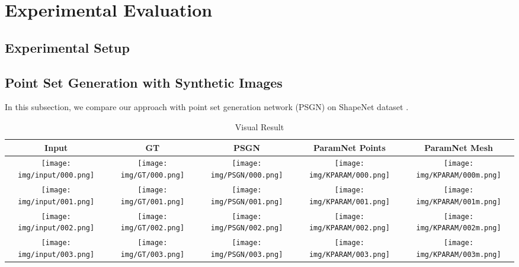 \section{Experimental Evaluation}
\subsection{Experimental Setup}
\subsection{Point Set Generation with Synthetic Images}
In this subsection, we compare our approach with point set generation network (PSGN)\cite{PSGN} on ShapeNet dataset \cite{shapenetdata}. 
\begin{table*}
	\centering
	\begin{tabular}{c c c c c}
		Input & GT & PSGN\cite{PSGN} & ParamNet Points & ParamNet Mesh \\
		\hline
		\texttt{[image: img/input/000.png]}&
		\texttt{[image: img/GT/000.png]}&
		\texttt{[image: img/PSGN/000.png]}&
		\texttt{[image: img/KPARAM/000.png]}&
		\texttt{[image: img/KPARAM/000m.png]}\\
		\texttt{[image: img/input/001.png]}&
		\texttt{[image: img/GT/001.png]}&
		\texttt{[image: img/PSGN/001.png]}&
		\texttt{[image: img/KPARAM/001.png]}&
		\texttt{[image: img/KPARAM/001m.png]}\\
		\texttt{[image: img/input/002.png]}&
		\texttt{[image: img/GT/002.png]}&
		\texttt{[image: img/PSGN/002.png]}&
		\texttt{[image: img/KPARAM/002.png]}&
		\texttt{[image: img/KPARAM/002m.png]}\\
		\texttt{[image: img/input/003.png]}&
		\texttt{[image: img/GT/003.png]}&
		\texttt{[image: img/PSGN/003.png]}&
		\texttt{[image: img/KPARAM/003.png]}&
		\texttt{[image: img/KPARAM/003m.png]}\\
	\end{tabular}
	\caption{Visual Result}
	\label{tab:vis}
\end{table*}
